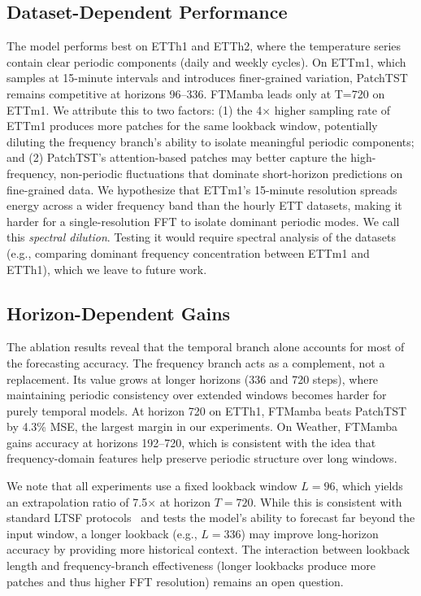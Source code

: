 \documentclass[symmetry,article,submit,pdftex,moreauthors]{Definitions/mdpi}
\begin{document}
\subsection{Dataset-Dependent Performance}

The model performs best on ETTh1 and ETTh2, where the temperature series contain clear periodic components (daily and weekly cycles). On ETTm1, which samples at 15-minute intervals and introduces finer-grained variation, PatchTST remains competitive at horizons 96--336. FTMamba leads only at T=720 on ETTm1. We attribute this to two factors: (1) the 4$\times$ higher sampling rate of ETTm1 produces more patches for the same lookback window, potentially diluting the frequency branch's ability to isolate meaningful periodic components; and (2) PatchTST's attention-based patches may better capture the high-frequency, non-periodic fluctuations that dominate short-horizon predictions on fine-grained data. We hypothesize that ETTm1's 15-minute resolution spreads energy across a wider frequency band than the hourly ETT datasets, making it harder for a single-resolution FFT to isolate dominant periodic modes. We call this \textit{spectral dilution}. Testing it would require spectral analysis of the datasets (e.g., comparing dominant frequency concentration between ETTm1 and ETTh1), which we leave to future work.

\subsection{Horizon-Dependent Gains}

The ablation results reveal that the temporal branch alone accounts for most of the forecasting accuracy. The frequency branch acts as a complement, not a replacement. Its value grows at longer horizons (336 and 720 steps), where maintaining periodic consistency over extended windows becomes harder for purely temporal models. At horizon 720 on ETTh1, FTMamba beats PatchTST by 4.3\% MSE, the largest margin in our experiments. On Weather, FTMamba gains accuracy at horizons 192--720, which is consistent with the idea that frequency-domain features help preserve periodic structure over long windows.

We note that all experiments use a fixed lookback window $L=96$, which yields an extrapolation ratio of 7.5$\times$ at horizon $T=720$. While this is consistent with standard LTSF protocols~\cite{ref6,ref7,ref8} and tests the model's ability to forecast far beyond the input window, a longer lookback (e.g., $L=336$) may improve long-horizon accuracy by providing more historical context. The interaction between lookback length and frequency-branch effectiveness (longer lookbacks produce more patches and thus higher FFT resolution) remains an open question.
\end{document}
